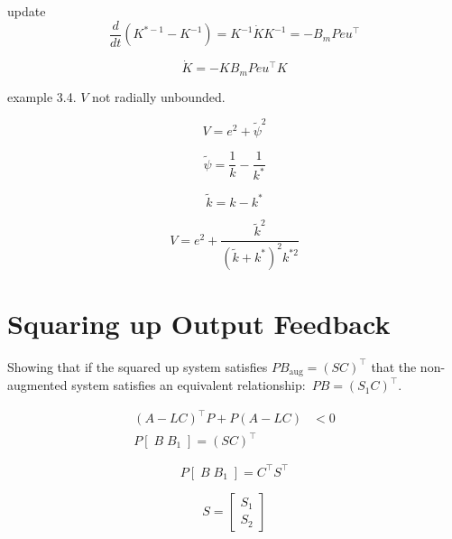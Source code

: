 update
\begin{equation*}
  \frac{d}{dt}(K^{*-1}-K^{-1})=K^{-1}\dot{K}K^{-1}=-B_{m}Peu^{\top}
\end{equation*}

\begin{equation*}
  \dot{K}=-KB_{m}Peu^{\top}K
\end{equation*}

example 3.4.
$V$ not radially unbounded.

\begin{equation*}
  V=e^{2}+\tilde{\psi}^{2}
\end{equation*}

\begin{equation*}
  \tilde{\psi}=\frac{1}{k}-\frac{1}{k^{*}}
\end{equation*}

\begin{equation*}
  \tilde{k}=k-k^{*}
\end{equation*}

\begin{equation*}
  V=e^{2}+\frac{\tilde{k}^{2}}{(\tilde{k}+k^{*})^{2}k^{*2}}
\end{equation*}

\section{Squaring up Output Feedback}

Showing that if the squared up system satisfies $PB_{\text{aug}}=(SC)^{\top}$ that the non-augmented system satisfies an equivalent relationship:\ $PB=(S_{1}C)^{\top}$.

\begin{equation*}
  \begin{split}
    (A-LC)^{\top}P+P(A-LC)&<0 \\
    P[\;B\;B_{1}\;]=(SC)^{\top}
  \end{split}
\end{equation*}

\begin{equation*}
  P[\;B\;B_{1}\;]=C^{\top}S^{\top}
\end{equation*}

\begin{equation*}
  S=
  \begin{bmatrix}
    S_{1} \\
    S_{2}
  \end{bmatrix}
\end{equation*}

